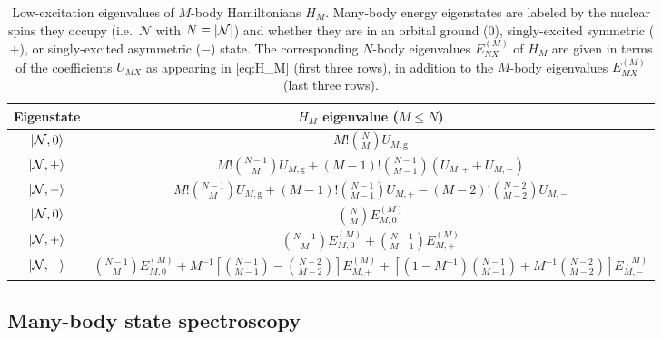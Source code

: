 \documentclass[preprint,showkeys,nofootinbib]{revtex4-1}
\newcommand{\p}[1]{\left(#1\right)} %
\renewcommand{\sp}[1]{\left[#1\right]} %
\newcommand{\g}{\text{g}}
\newcommand{\N}{\mathcal{N}}
\newcommand{\1}{\mathds{1}}
\begin{document}
\begin{table}
  \centering
  \caption{\footnotesize Low-excitation eigenvalues of $M$-body
    Hamiltonians $H_M$.  Many-body energy eigenstates are labeled by
    the nuclear spins they occupy (i.e.~$\N$ with $N\equiv\abs{\N}$)
    and whether they are in an orbital ground ($0$), singly-excited
    symmetric ($+$), or singly-excited asymmetric ($-$) state.  The
    corresponding $N$-body eigenvalues $E_{NX}^{(M)}$ of $H_M$ are
    given in terms of the coefficients $U_{MX}$ as appearing in
    \eqref{eq:H_M} (first three rows), in addition to the $M$-body
    eigenvalues $E_{MX}^{(M)}$ (last three rows).}
  \label{tab:eigen}
  \begin{tabular}{c|c}
    Eigenstate
    & $H_M$ eigenvalue ($M\le N$) \\ \hline\hline
    $\ket{\N,0}$
    & $M! {N \choose M} U_{M,\g}$ \\ \hline
    $\ket{\N,+}$
    & $M! {N-1 \choose M} U_{M,\g}
    + \p{M-1}! {N-1 \choose M-1} \p{U_{M,+} + U_{M,-}}$ \\ \hline
    $\ket{\N,-}$
    & $M! {N-1 \choose M} U_{M,\g}
    + \p{M-1}! {N-1 \choose M-1} U_{M,+}
    - \p{M-2}! {N-2 \choose M-2} U_{M,-}$ \\ \hline\hline
    $\ket{\N,0}$
    & ${N \choose M} E_{M,0}^{(M)}$ \\ \hline
    $\ket{\N,+}$
    & ${N-1 \choose M} E_{M,0}^{(M)}
    + {N-1 \choose M-1} E_{M,+}^{(M)}$ \\ \hline
    $\ket{\N,-}$
    & ${N-1 \choose M} E_{M,0}^{(M)}
    + M^{-1} \sp{{N-1 \choose M-1} - {N-2 \choose M-2}} E_{M,+}^{(M)}
    + \sp{\p{1 - M^{-1}} {N-1 \choose M-1}
      + M^{-1} {N-2 \choose M-2}} E_{M,-}^{(M)}$
  \end{tabular}
\end{table}


\subsection{Many-body state spectroscopy}
\end{document}
